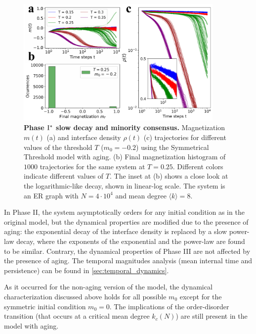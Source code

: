\begin{figure}
    \centering
    \includegraphics[width=0.9\textwidth]{Figs/Aging_STM/FIG7.pdf}
    \caption{\label{fig:mixed_phase} \textbf{Phase ${\rm I}^{*}$ slow decay and minority consensus.} Magnetization $m(t)$ (a) and interface density $\rho(t)$ (c) trajectories for different values of the threshold $T$ ($m_0 = -0.2$) using the Symmetrical Threshold model with aging. (b) Final magnetization histogram of $1000$ trajectories for the same system at $T=0.25$. Different colors indicate different values of $T$. The inset at (b) shows a close look at the logarithmic-like decay, shown in linear-log scale. The system is an ER graph with $N = 4 \cdot 10^4$ and mean degree $\langle k \rangle = 8$.}
\end{figure}
In Phase II, the system asymptotically orders for any initial condition as in the original model, but the dynamical properties are modified due to the presence of aging: the exponential decay of the interface density is replaced by a slow power-law decay, where the exponents of the exponential and the power-law are found to be similar. Contrary, the dynamical properties of Phase III are not affected by the presence of aging. The temporal magnitudes analysis (mean internal time and persistence) can be found in \ref{sec:temporal_dynamics}. 

As it occurred for the non-aging version of the model, the dynamical characterization discussed above holds for all possible
$m_0$ except for the symmetric initial condition $m_0 = 0$. The implications of the order-disorder transition (that occurs at a critical mean degree $k_c (N)$) \cite{Konstantin} are still present in the model with aging.

